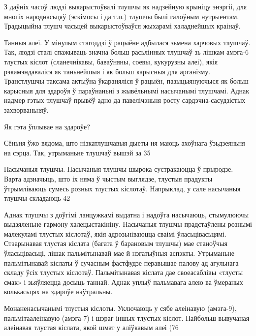 З даўніх часоў людзі выкарыстоўвалі тлушчы як надзейную крыніцу энэргіі, для многіх народнасьцяў (эскімосы і да т.п.) тлушчы былі галоўным нутрыентам. Традыцыйна тлушч часьцей выкарыстоўваўся жыхарамі халаднейшых краінаў.

Танныя алеі.
У мінулым стагоддзі ў рацыёне адбылася зьмена харчовых тлушчаў. Так, людзі сталі спажываць значна больш расьлінных тлушчаў зь лішкам амэга-6 тлустых кіслот (сланечнікавы, баваўняны, соевы, кукурузны алеі), якія рэкамэндаваліся як таньнейшыя і як больш карысныя для арганізму. Транстлушчы таксама актыўна ўкараняліся ў рацыён, пазыцыянуючыся як больш карысныя для здароўя ў параўнаньні з жывёльнымі насычанымі тлушчамі. Аднак надмер гэтых тлушчаў прывёў адно да павелічэньня росту сардэчна-сасудзістых захворваньняў.

Як гэта ўплывае на здароўе?

Сёньня ўжо вядома, што нізкатлушчавыя дыеты ня маюць ахоўнага ўзьдзеяньня на сэрца. Так, утрыманьне тлушчаў вышэй за 35%

Насычаныя тлушчы.
Насычаныя тлушчы шырока сустракаюцца ў прыродзе. Варта адзначыць, што іх няма ў чыстым выглядзе, тлустыя прадукты ўтрымліваюць сумесь розных тлустых кіслотаў. Напрыклад, у сале насычаныя тлушчы складаюць 42%

Аднак тлушчы з доўгімі ланцужкамі выдатна і надоўга насычаюць, стымулюючы выдзяленьне гармону халецыстакініну. Насычаныя тлушчы прадстаўлены рознымі малекуламі тлустых кіслотаў, якія адрозьніваюцца сваімі ўласьцівасьцямі. Стэарынавая тлустая кіслата (багата ў барановым тлушчы) мае станоўчыя ўласьцівасьці, лішак пальмітынавай мае й нэгатыўныя аспэкты. Утрыманьне пальмітынавай кіслаты ў сучасным фастфудзе перавышае палову ад агульнага складу ўсіх тлустых кіслотаў. Пальмітынавая кіслата дае своеасаблівы «тлусты смак» і зьяўляецца досыць таннай. Аднак уплыў пальмавага алею ва ўмераных колькасьцях на здароўе нэўтральны.

Монаненасычанымі тлустыя кіслоты.
Уключаюць у сябе алеінавую (амэга-9), пальмітаалеінавую (амэга-7) і шэраг іншых тлустых кіслот. Найбольш вывучаная алеінавая тлустая кіслата, якой шмат у аліўкавым алеі (76%

